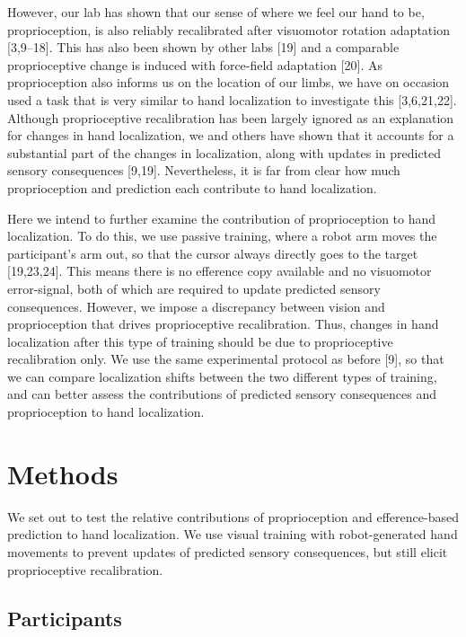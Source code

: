 \documentclass[10pt,letterpaper]{article}
\begin{document}
However, our lab has shown that our sense of where we feel our hand to
be, proprioception, is also reliably recalibrated after visuomotor
rotation adaptation {[}3,9--18{]}. This has also been shown by other
labs {[}19{]} and a comparable proprioceptive change is induced with
force-field adaptation {[}20{]}. As proprioception also informs us on
the location of our limbs, we have on occasion used a task that is very
similar to hand localization to investigate this {[}3,6,21,22{]}.
Although proprioceptive recalibration has been largely ignored as an
explanation for changes in hand localization, we and others have shown
that it accounts for a substantial part of the changes in localization,
along with updates in predicted sensory consequences {[}9,19{]}.
Nevertheless, it is far from clear how much proprioception and
prediction each contribute to hand localization.

Here we intend to further examine the contribution of proprioception to
hand localization. To do this, we use passive training, where a robot
arm moves the participant's arm out, so that the cursor always directly
goes to the target {[}19,23,24{]}. This means there is no efference copy
available and no visuomotor error-signal, both of which are required to
update predicted sensory consequences. However, we impose a discrepancy
between vision and proprioception that drives proprioceptive
recalibration. Thus, changes in hand localization after this type of
training should be due to proprioceptive recalibration only. We use the
same experimental protocol as before {[}9{]}, so that we can compare
localization shifts between the two different types of training, and can
better assess the contributions of predicted sensory consequences and
proprioception to hand localization.

\section{Methods}\label{methods}

We set out to test the relative contributions of proprioception and
efference-based prediction to hand localization. We use visual training
with robot-generated hand movements to prevent updates of predicted
sensory consequences, but still elicit proprioceptive recalibration.

\subsection{Participants}\label{participants}
\end{document}
